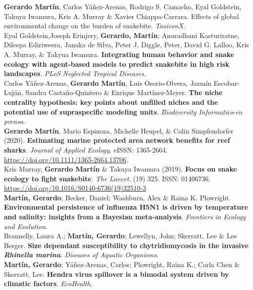 \documentclass[12pt, a4paper]{article}
\newcommand{\years}[1]{\marginnote{\scriptsize #1}}
\begin{document}
\years{2021} \textbf{Gerardo Martín}, Carlos Y\'a\~nez-Arenas, Rodrigo S. Camacho, Eyal Goldstein, Takuya Iwamura, Kris A. Murray \& Xavier Chiappa-Carrara. Effects of global environmental change on the burden of snakebite. \emph{ToxiconX}.\\

\years{2021} Eyal Goldstein,Joseph Erinjery, \textbf{Gerardo, Mart\'in}; Anuradhani Kasturiratne, Dileepa Ediriweera, Janaka de Silva, Peter J. Diggle, Peter, David G. Lalloo, Kris A. Murray, \& Takyua Iwamura. \textbf{Integrating human behavior and snake ecology with agent-based models to predict snakebite in high risk landscapes}. \emph{PLoS Neglected Tropical Diseases}.\\

\years{2020} Carlos Y\'a\~nez-Arenas, \textbf{Gerardo Mart\'in}, Luis Osorio-Olvera, Jazm\'in Escobar-Luj\'an, Sandra Casta\~no-Quintero \& Enrique Mart\'inez-Meyer. \textbf{The niche centrality hypothesis: key points about unfilled niches and the potential use of supraspecific modeling units}. \emph{Biodiversity Informatics}-\emph{en prensa}.\\

\years{2020} \textbf{Gerardo Mart\'in}, Mario Espinoza, Michelle Heupel, \& Colin Simpfendorfer (2020). \textbf{Estimating marine protected area network benefits for reef sharks}. \emph{Journal of Applied Ecology}. eISSN: 1365-2664. \url{https://doi.org/10.1111/1365-2664.13706}.\\

\years{2019} Kris Murray, \textbf{Gerardo Mart\'in} \& Takuya Iwamura (2019). \textbf{Focus on snake ecology to fight snakebite}. \emph{The Lancet}. (19) 325. ISSN: 01406736. \url{https://doi.org/10.1016/S0140-6736(19)32510-3}\\

\years{2018} \textbf{Mart\'in, Gerardo}; Becker, Daniel; Washburn, Alex \& Raina K. Plowright. \textbf{Environmental persistence of influenza H5N1 is driven by temperature and salinity: insights from a Bayesian meta-analysis}. \emph{Frontiers in Ecology and Evolution}.\\

\years{2018} Brannelly, Laura A.; \textbf{Mart\'in, Gerardo}; Lewellyn, John; Skerratt, Lee \& Lee Berger. \textbf{Size dependant susceptibility to chytridiomycosis in the invasive \emph{Rhinella marina}}. \emph{Diseases of Aquatic Organisms}.\\

\years{2018} \textbf{Mart\'in, Gerardo}; Y\'a\~nez-Arenas, Carlos; Plowright, Raina K.; Carla Chen \& Skerratt, Lee. \textbf{Hendra virus spillover is a bimodal system driven by climatic factors}. \emph{EcoHealth}.\\
\end{document}
